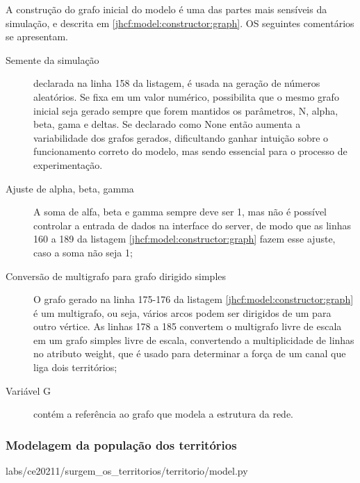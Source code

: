 A construção do grafo inicial do modelo é uma das partes mais sensíveis da simulação, e descrita em \ref{jhcf:model:constructor:graph}. OS seguintes comentários se apresentam.
\begin{description}
\item [Semente da simulação] declarada na linha 158 da listagem, é usada na geração de números aleatórios. Se fixa em um valor numérico, possibilita que o mesmo grafo inicial seja gerado sempre que forem mantidos os parâmetros, N, alpha, beta, gama e deltas. Se declarado como None então aumenta a variabilidade dos grafos gerados, dificultando ganhar intuição sobre o funcionamento correto do modelo, mas sendo essencial para o processo de experimentação.
\item [Ajuste de alpha, beta, gamma] A soma de alfa, beta e gamma sempre deve ser 1, mas não é possível controlar a entrada de dados na interface do server, de modo que as linhas 160 a 189 da listagem \ref{jhcf:model:constructor:graph} fazem esse ajuste, caso a soma não seja 1;
\item [Conversão de multigrafo para grafo dirigido simples] O grafo gerado na linha 175-176 da listagem \ref{jhcf:model:constructor:graph} é um multigrafo, ou seja, vários arcos podem ser dirigidos de um para outro vértice. As linhas 178 a 185 convertem o multigrafo livre de escala em um grafo simples livre de escala, convertendo a multiplicidade de linhas no atributo weight, que é usado para determinar a força de um canal que liga dois territórios;
\item [Variável G] contém a referência ao grafo que modela a estrutura da rede.
\end{description}

\subsubsection{Modelagem da população dos territórios}


{labs/ce20211/surgem_os_territorios/territorio/model.py}

